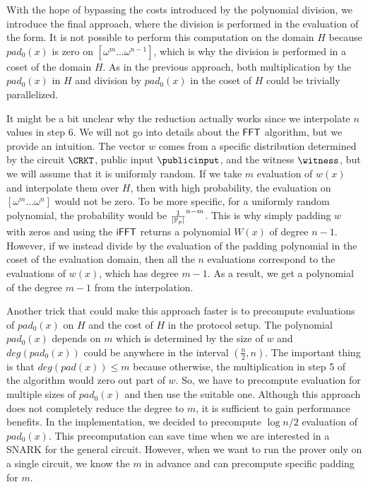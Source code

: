 With the hope of bypassing the costs introduced by the polynomial division, we introduce the final approach, where the division is performed in the evaluation of the form. It is not possible to perform this computation on the domain $H$ because $pad_0(x)$ is zero on $[\omega^m \ldots \omega^{n-1}]$, which is why the division is performed in a coset of the domain $H$. As in the previous approach, both multiplication by the $pad_0(x)$ in $H$ and division by $pad_0(x)$ in the coset of $H$ could be trivially parallelized.

It might be a bit unclear why the reduction actually works since we interpolate $n$ values in step 6. We will not go into details about the $\mathsf{FFT}$ algorithm, but we provide an intuition. The vector $w$ comes from a specific distribution determined by the circuit $\CRKT$, public input $\publicinput$, and the witness $\witness$, but we will assume that it is uniformly random. If we take $m$ evaluation of $w(x)$ and interpolate them over $H$, then with high probability, the evaluation on $[\omega^{m} \ldots \omega^{n}]$ would not be zero. To be more specific, for a uniformly random polynomial, the probability would be $\frac{1}{|\mathbb{F}_p|}^{n-m}$. This is why simply padding $w$ with zeros and using the $\mathsf{iFFT}$ returns a polynomial $W(x)$ of degree $n-1$. However, if we instead divide by the evaluation of the padding polynomial in the coset of the evaluation domain, then all the $n$ evaluations correspond to the evaluations of $w(x)$, which has degree $m-1$. As a result, we get a polynomial of the degree $m-1$ from the interpolation.

Another trick that could make this approach faster is to precompute evaluations of $pad_0(x)$ on $H$ and the cost of $H$ in the protocol setup. The polynomial $pad_0(x)$ depends on $m$ which is determined by the size of $w$ and $deg(pad_0(x))$ could be anywhere in the interval $(\frac{n}{2}, n)$. The important thing is that $deg(pad(x)) \leq m$ because otherwise, the multiplication in step 5 of the algorithm would zero out part of $w$. So, we have to precompute evaluation for multiple sizes of $pad_0(x)$ and then use the suitable one. Although this approach does not completely reduce the degree to $m$, it is sufficient to gain performance benefits. In the implementation, we decided to precompute $\log{n/2}$ evaluation of $pad_0(x)$. This precomputation can save time when we are interested in a SNARK for the general circuit. However, when we want to run the prover only on a single circuit, we know the $m$ in advance and can precompute specific padding for $m$. 

